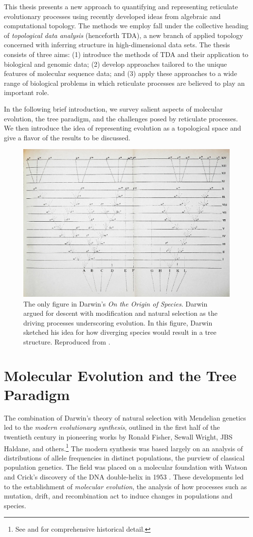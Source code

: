 This thesis presents a new approach to quantifying and representing reticulate evolutionary processes using recently developed ideas from algebraic and computational topology.
The methods we employ fall under the collective heading of \emph{topological data analysis} (henceforth TDA), a new branch of applied topology concerned with inferring structure in high-dimensional data sets.
The thesis consists of three aims: (1) introduce the methods of TDA and their application to biological and genomic data; (2) develop approaches tailored to the unique features of molecular sequence data; and (3) apply these approaches to a wide range of biological problems in which reticulate processes are believed to play an important role.

In the following brief introduction, we survey salient aspects of molecular evolution, the tree paradigm, and the challenges posed by reticulate processes.
We then introduce the idea of representing evolution as a topological space and give a flavor of the results to be discussed.

\begin{figure}
\centering
\includegraphics[width=.5\columnwidth]{./fig/introduction/Darwin_divergence.jpg}
\caption[Charles Darwin's Evolutionary Tree]{The only figure in Darwin's \emph{On the Origin of Species}. Darwin argued for descent with modification and natural selection as the driving processes underscoring evolution. In this figure, Darwin sketched his idea for how diverging species would result in a tree structure. Reproduced from \cite{Darwin:1859uh}.}
\label{fig:darwin_origin}
\end{figure}

\section{Molecular Evolution and the Tree Paradigm}

The combination of Darwin's theory of natural selection with Mendelian genetics led to the \emph{modern evolutionary synthesis}, outlined in the first half of the twentieth century in pioneering works by Ronald Fisher, Sewall Wright, JBS Haldane, and others.\footnote{See \cite{Huxley:1942} and \cite{Gould:2002ts} for comprehensive historical detail.}
The modern synthesis was based largely on an analysis of distributions of allele frequencies in distinct populations, the purview of classical population genetics.
The field was placed on a molecular foundation with Watson and Crick's discovery of the DNA double-helix in 1953 \cite{Watson:1953wm}.
These developments led to the establishment of \emph{molecular evolution}, the analysis of how processes such as mutation, drift, and recombination act to induce changes in populations and species.

